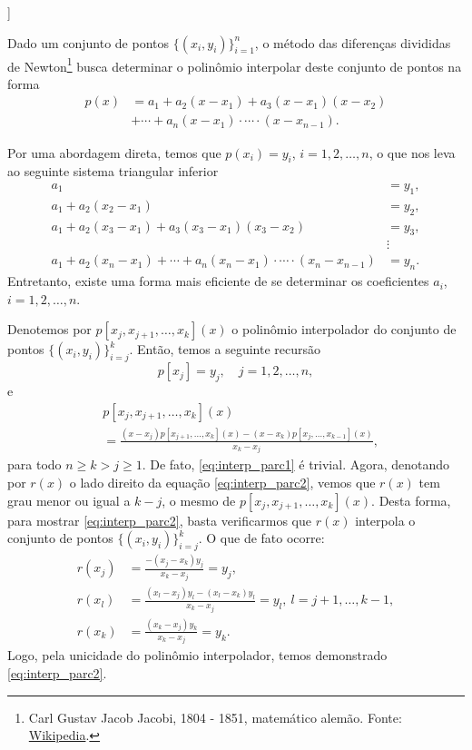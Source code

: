 \begin{flushleft}
  [[tag:revisar]]
\end{flushleft}

Dado um conjunto de pontos $\{(x_i, y_i)\}_{i=1}^n$, o método das diferenças divididas de Newton\footnote{Carl Gustav Jacob Jacobi, 1804 - 1851, matemático alemão. Fonte: \href{https://en.wikipedia.org/wiki/Carl_Gustav_Jacob_Jacobi}{Wikipedia}.} busca determinar o polinômio interpolar deste conjunto de pontos na forma
\begin{align}
  p(x) &= a_1 + a_2(x-x_1) + a_3(x-x_1)(x-x_2)\\
       &+ \cdots + a_{n}(x-x_1)\cdot \cdots \cdot (x-x_{n-1}).
\end{align}

Por uma abordagem direta, temos que $p(x_i)=y_i$, $i=1, 2, \dotsc, n$, o que nos leva ao seguinte sistema triangular inferior
\begin{align}
  a_1 &= y_1, \\
  a_1 + a_2(x_2-x_1) &= y_2, \\
  a_1 + a_2(x_3-x_1) + a_3(x_3-x_1)(x_3-x_2) &= y_3, \\
  &\vdots\\
  a_1 + a_2(x_n-x_1) + \cdots + a_{n}(x_n-x_1)\cdot\cdots\cdot(x_n-x_{n-1}) &= y_n.
\end{align}
Entretanto, existe uma forma mais eficiente de se determinar os coeficientes $a_i$, $i=1, 2, \dotsc, n$.

Denotemos por $p[x_j, x_{j+1}, \dotsc, x_{k}](x)$ o polinômio interpolador do conjunto de pontos $\{(x_i, y_i)\}_{i=j}^k$. Então, temos a seguinte recursão
\begin{equation} \label{eq:interp_parc1}
  p[x_j] = y_j,\quad j=1, 2, \dotsc, n,
\end{equation}
e
\begin{align}
  &p[x_j, x_{j+1}, \ldots, x_k](x) \nonumber\\
  &= \frac{(x-x_j)p[x_{j+1},\dotsc,x_k](x)-(x-x_k)p[x_j,\dotsc,x_{k-1}](x)}{x_k-x_j},\label{eq:interp_parc2}
\end{align}
para todo $n\geq k > j \geq 1$. De fato, \eqref{eq:interp_parc1} é trivial. Agora, denotando por $r(x)$ o lado direito da equação \eqref{eq:interp_parc2}, vemos que $r(x)$ tem grau menor ou igual a $k-j$, o mesmo de $p[x_j, x_{j+1}, \ldots, x_k](x)$. Desta forma, para mostrar \eqref{eq:interp_parc2}, basta verificarmos que $r(x)$ interpola o conjunto de pontos $\{(x_i, y_i)\}_{i=j}^k$. O que de fato ocorre:
\begin{align}
  r(x_j) &= \frac{-(x_j-x_k)y_j}{x_k-x_j} = y_j,\\
  r(x_{l}) &= \frac{(x_l-x_j)y_l-(x_l-x_k)y_l}{x_k-x_j}=y_l,~l=j+1,\dotsc,k-1,\\
  r(x_k) &= \frac{(x_k-x_j)y_k}{x_k-x_j}=y_k.
\end{align}
Logo, pela unicidade do polinômio interpolador, temos demonstrado \eqref{eq:interp_parc2}.

